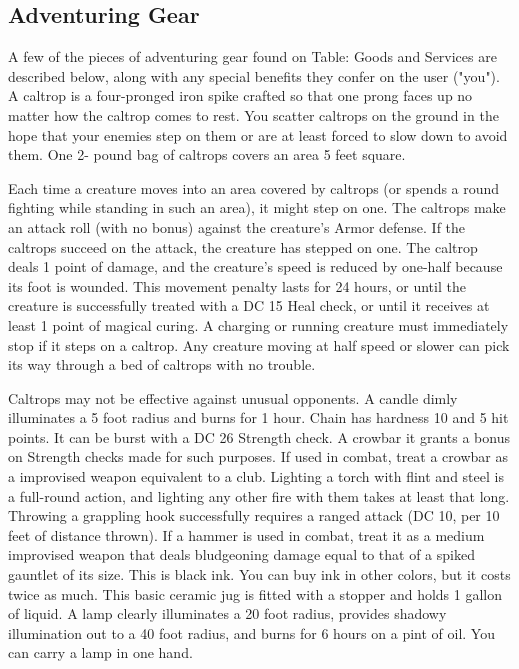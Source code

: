 \subsection{Adventuring Gear}
A few of the pieces of adventuring gear found on Table: Goods and Services are described below, along with any special benefits they confer on the user ("you").
 A caltrop is a four-pronged iron spike crafted so that one prong faces up no matter how the caltrop comes to rest. You scatter caltrops on the ground in the hope that your enemies step on them or are at least forced to slow down to avoid them. One 2- pound bag of caltrops covers an area 5 feet square.
\par Each time a creature moves into an area covered by caltrops (or spends a round fighting while standing in such an area), it might step on one. The caltrops make an attack roll (with no bonus) against the creature's Armor defense. If the caltrops succeed on the attack, the creature has stepped on one. The caltrop deals 1 point of damage, and the creature's speed is reduced by one-half because its foot is wounded. This movement penalty lasts for 24 hours, or until the creature is successfully treated with a DC 15 Heal check, or until it receives at least 1 point of magical curing. A charging or running creature must immediately stop if it steps on a caltrop. Any creature moving at half speed or slower can pick its way through a bed of caltrops with no trouble.
\par Caltrops may not be effective against unusual opponents.
 A candle dimly illuminates a 5 foot radius and burns for 1 hour.
 Chain has hardness 10 and 5 hit points. It can be burst with a DC 26 Strength check.
 A crowbar it grants a  bonus on Strength checks made for such purposes. If used in combat, treat a crowbar as a improvised weapon equivalent to a club.
 Lighting a torch with flint and steel is a full-round action, and lighting any other fire with them takes at least that long.
 Throwing a grappling hook successfully requires a ranged attack (DC 10,  per 10 feet of distance thrown).
 If a hammer is used in combat, treat it as a medium improvised weapon that deals bludgeoning damage equal to that of a spiked gauntlet of its size.
 This is black ink. You can buy ink in other colors, but it costs twice as much.
 This basic ceramic jug is fitted with a stopper and holds 1 gallon of liquid.
 A lamp clearly illuminates a 20 foot radius, provides shadowy illumination out to a 40 foot radius, and burns for 6 hours on a pint of oil. You can carry a lamp in one hand.
